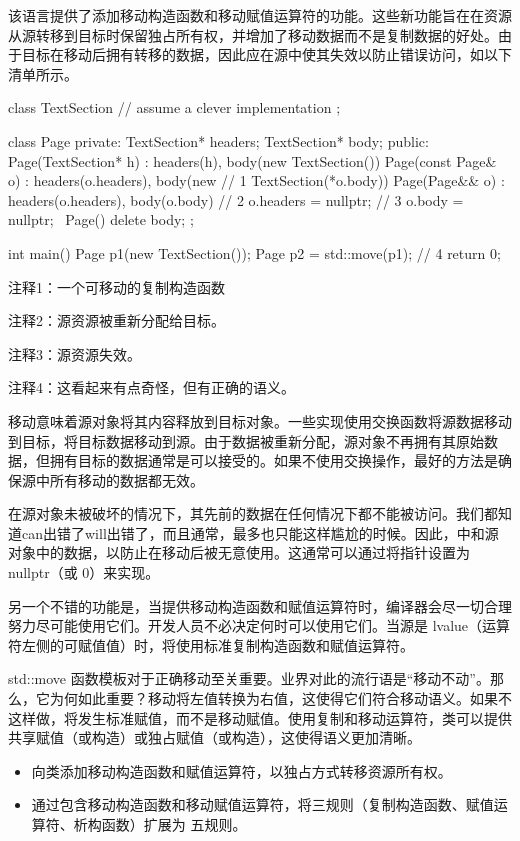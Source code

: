该语言提供了添加移动构造函数和移动赋值运算符的功能。这些新功能旨在在资源从源转移到目标时保留独占所有权，并增加了移动数据而不是复制数据的好处。由于目标在移动后拥有转移的数据，因此应在源中使其失效以防止错误访问，如以下清单所示。


\begin{cpp}
class TextSection {
  // assume a clever implementation
};

class Page {
private:
  TextSection* headers;
  TextSection* body;
public:
  Page(TextSection* h) : headers(h), body(new TextSection()) {}
  Page(const Page& o) : headers(o.headers), body(new // 1
  TextSection(*o.body)) {}
  Page(Page&& o) : headers(o.headers), body(o.body) { // 2
    o.headers = nullptr; // 3
    o.body = nullptr;
  }
  ~Page() { delete body; }
};

int main() {
  Page p1(new TextSection());
  Page p2 = std::move(p1); // 4
  return 0;
}
\end{cpp}

{\footnotesize
注释1：一个可移动的复制构造函数

注释2：源资源被重新分配给目标。

注释3：源资源失效。

注释4：这看起来有点奇怪，但有正确的语义。
}

移动意味着源对象将其内容释放到目标对象。一些实现使用交换函数将源数据移动到目标，将目标数据移动到源。由于数据被重新分配，源对象不再拥有其原始数据，但拥有目标的数据通常是可以接受的。如果不使用交换操作，最好的方法是确保源中所有移动的数据都无效。

在源对象未被破坏的情况下，其先前的数据在任何情况下都不能被访问。我们都知道can出错了will出错了，而且通常，最多也只能这样尴尬的时候。因此，中和源对象中的数据，以防止在移动后被无意使用。这通常可以通过将指针设置为 nullptr（或 0）来实现。

另一个不错的功能是，当提供移动构造函数和赋值运算符时，编译器会尽一切合理努力尽可能使用它们。开发人员不必决定何时可以使用它们。当源是 lvalue（运算符左侧的可赋值值）时，将使用标准复制构造函数和赋值运算符。

std::move 函数模板对于正确移动至关重要。业界对此的流行语是“移动不动”。那么，它为何如此重要？移动将左值转换为右值，这使得它们符合移动语义。如果不这样做，将发生标准赋值，而不是移动赋值。使用复制和移动运算符，类可以提供共享赋值（或构造）或独占赋值（或构造），这使得语义更加清晰。


\begin{itemize}
\item
向类添加移动构造函数和赋值运算符，以独占方式转移资源所有权。

\item
通过包含移动构造函数和移动赋值运算符，将三规则（复制构造函数、赋值运算符、析构函数）扩展为 五规则。
\end{itemize}
















